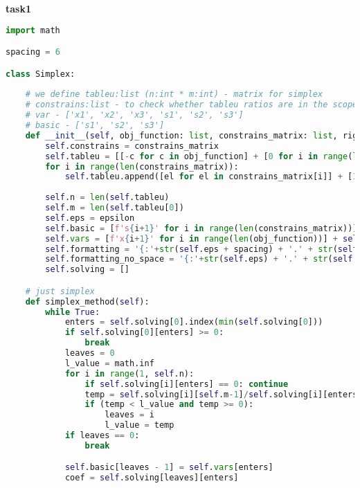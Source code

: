 \documentclass[12pt, legalpaper]{exam}
\begin{document}
\noindent
{}




\vspace{24pt}
\noindent    
\newpage
\textbf{task1}

\begin{lstlisting}[language=Python, caption=Программа на Python, label=lst:python-code]
import math

spacing = 6

class Simplex:
    
    # we define tableu:list (n:int * m:int) - matrix for simplex
    # constrains:list - to check whether tableu ratios are in the scope of them
    # var - ['x1', 'x2', 'x3', 's1', 's2', 's3']
    # basic - ['s1', 's2', 's3']
    def __init__(self, obj_function: list, constrains_matrix: list, right_hand_side_num: list, epsilon:int):
        self.constrains = constrains_matrix
        self.tableu = [[-c for c in obj_function] + [0 for i in range(len(constrains_matrix))] + [0]]
        for i in range(len(constrains_matrix)):
            self.tableu.append([el for el in constrains_matrix[i]] + [1 if i == j else 0 for j in range(len(constrains_matrix))] + [right_hand_side_num[i]])
        
        self.n = len(self.tableu)
        self.m = len(self.tableu[0])
        self.eps = epsilon
        self.basic = [f's{i+1}' for i in range(len(constrains_matrix))]
        self.vars = [f'x{i+1}' for i in range(len(obj_function))] + self.basic
        self.formatting = '{:'+str(self.eps + spacing) + '.' + str(self.eps) + 'f}'
        self.formatting_no_space = '{:'+str(self.eps) + '.' + str(self.eps) + 'f}'
        self.solving = []

    # just simplex 
    def simplex_method(self):
        while True:
            enters = self.solving[0].index(min(self.solving[0]))
            if self.solving[0][enters] >= 0:
                break
            leaves = 0
            l_value = math.inf
            for i in range(1, self.n):
                if self.solving[i][enters] == 0: continue
                temp = self.solving[i][self.m-1]/self.solving[i][enters]
                if (temp < l_value and temp >= 0):
                    leaves = i
                    l_value = temp
            if leaves == 0:
                break

            self.basic[leaves - 1] = self.vars[enters]
            coef = self.solving[leaves][enters]


\end{lstlisting}
\end{document}
